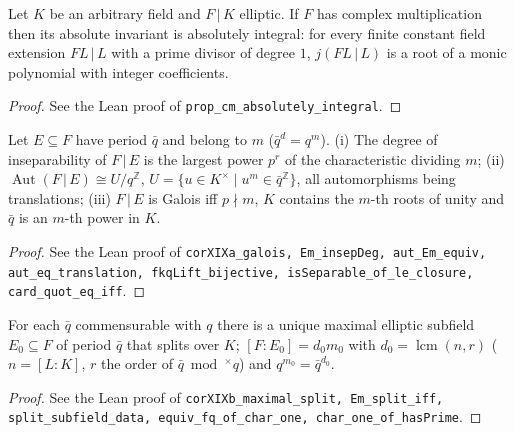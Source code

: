 \begin{proposition}
\label{prop:abs-integral}
\leanok
Let $K$ be an arbitrary field and $F\,|\,K$ elliptic. If $F$ has complex multiplication then its absolute invariant is absolutely integral: for every finite constant field extension $FL\,|\,L$ with a prime divisor of degree $1$, $j(FL\,|\,L)$ is a root of a monic polynomial with integer coefficients.
\end{proposition}
\begin{proof}
See the Lean proof of \texttt{prop\_cm\_absolutely\_integral}.
\end{proof}

\begin{corollary}
\label{cor:XIXa}
\leanok
Let $E\subseteq F$ have period $\bar q$ and belong to $m$ ($\bar q^d=q^m$). (i) The degree of inseparability of $F\,|\,E$ is the largest power $p^r$ of the characteristic dividing $m$; (ii) $\operatorname{Aut}(F\,|\,E)\cong U/q^{\mathbb Z}$, $U=\{u\in K^\times\mid u^m\in\bar q^{\mathbb Z}\}$, all automorphisms being translations; (iii) $F\,|\,E$ is Galois iff $p\nmid m$, $K$ contains the $m$-th roots of unity and $\bar q$ is an $m$-th power in $K$.
\end{corollary}
\begin{proof}
\leanok
See the Lean proof of \texttt{corXIXa\_galois, Em\_insepDeg, aut\_Em\_equiv, aut\_eq\_translation, fkqLift\_bijective, isSeparable\_of\_le\_closure, card\_quot\_eq\_iff}.
\end{proof}

\begin{corollary}
\label{cor:XIXb}
\leanok
For each $\bar q$ commensurable with $q$ there is a unique maximal elliptic subfield $E_0\subseteq F$ of period $\bar q$ that splits over $K$; $[F:E_0]=d_0m_0$ with $d_0=\operatorname{lcm}(n,r)$ ($n=[L:K]$, $r$ the order of $\bar q\bmod^\times q$) and $q^{m_0}=\bar q^{d_0}$.
\end{corollary}
\begin{proof}
\leanok
See the Lean proof of \texttt{corXIXb\_maximal\_split, Em\_split\_iff, split\_subfield\_data, equiv\_fq\_of\_char\_one, char\_one\_of\_hasPrime}.
\end{proof}

